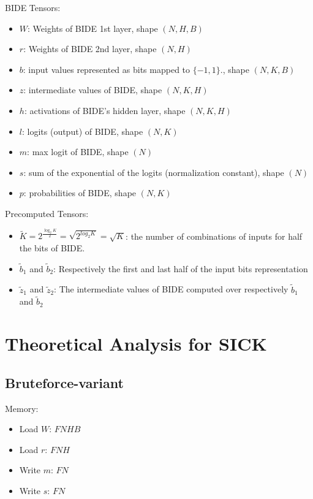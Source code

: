 \documentclass{article}
\begin{document}
BIDE Tensors:
\begin{itemize}
\item $W$: Weights of BIDE 1st layer, shape $(N, H, B)$
\item $r$: Weights of BIDE 2nd layer, shape $(N, H)$
\item $b$: input values represented as bits mapped to $\{-1, 1\}$., shape $(N, K, B)$
\item $z$: intermediate values of BIDE, shape $(N, K, H)$
\item $h$: activations of BIDE's hidden layer, shape $(N, K, H)$
\item $l$: logits (output) of BIDE, shape $(N, K)$
\item $m$: max logit of BIDE, shape $(N)$
\item $s$: sum of the exponential of the logits (normalization constant), shape $(N)$
\item $p$: probabilities of BIDE, shape $(N, K)$
\end{itemize}

Precomputed Tensors:
\begin{itemize}
    \item $\tilde{K}=2^{\frac{\log_2{K}}{2}}=\sqrt{2^{log_2{K}}}=\sqrt{K}$: the number of combinations of inputs for half the bits of BIDE.
    \item $\tilde{b}_1$ and $\tilde{b}_2$: Respectively the first and last half of the input bits representation
    \item $\tilde{z}_1$ and $\tilde{z}_2$: The intermediate values of BIDE computed over respectively $\tilde{b}_1$ and $\tilde{b}_2$

\end{itemize}

\section{Theoretical Analysis for SICK} \label{apdx:theoretical_analysis}
\subsection{Bruteforce-variant}
Memory:
\begin{itemize}
    \item Load $W$: $FNHB$
    \item Load $r$: $FNH$
    \item Write $m$: $FN$
    \item Write $s$: $FN$
\end{itemize}
\end{document}
